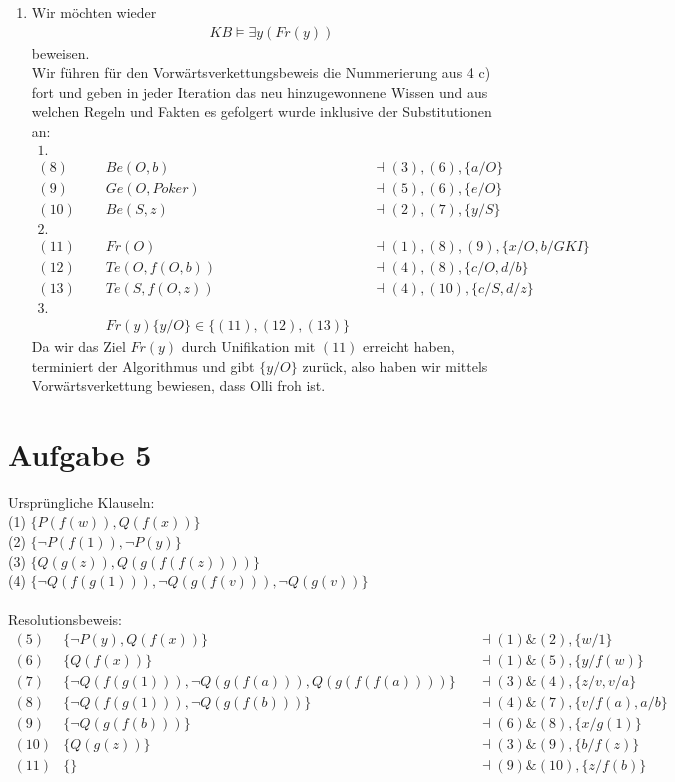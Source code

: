 \documentclass[a4paper,10pt]{article}
\begin{document}
\begin{enumerate}[~~a)]
    \item
    Wir möchten wieder
    \begin{align*}
KB \vDash \exists y (Fr(y))
\end{align*}
	beweisen.\\
    Wir führen für den Vorwärtsverkettungsbeweis die Nummerierung aus 4 c) fort und geben in jeder Iteration das neu hinzugewonnene Wissen und aus welchen Regeln und Fakten es gefolgert wurde inklusive der Substitutionen an:\\
    \begin{align*}
    \text{1. Iteration:}&\\
    (8) &Be(O,b) &&\dashv (3),(6),\{a/O\}\\
    (9) &Ge(O,Poker) &&\dashv (5),(6),\{e/O\}\\
    (10) &Be(S,z) &&\dashv (2),(7),\{y/S\}\\
    \text{2. Iteration:}&\\
    (11) &Fr(O) &&\dashv (1),(8),(9),\{x/O,b/GKI\}\\
    (12) &Te(O,f(O,b)) &&\dashv (4),(8),\{c/O,d/b\}\\
    (13) &Te(S,f(O,z)) &&\dashv (4),(10),\{c/S,d/z\}\\
    \text{3. Iteration:}&\\
    &Fr(y) \{y/O\} \in \{(11),(12),(13)\}
    \end{align*}
    Da wir das Ziel $Fr(y)$ durch Unifikation mit $(11)$ erreicht haben, terminiert der Algorithmus und gibt $\{y/O\}$ zurück, also haben wir mittels Vorwärtsverkettung bewiesen, dass Olli froh ist.
\end{enumerate}

\section*{Aufgabe 5}
Ursprüngliche Klauseln:\\
(1) $\{P(f(w)), Q(f(x))\}$\\
(2) $\{ \lnot P(f(1)), \lnot P(y) \}$\\
(3) $\{Q(g(z)), Q(g(f(f(z))))\}$\\
(4) $\{\lnot Q(f(g(1))), \lnot Q(g(f(v))), \lnot Q(g(v))\}$\\
\\
Resolutionsbeweis:\\
\begin{align*}
(5) &\{\lnot P(y), Q(f(x))\} &&\dashv (1) \& (2), \{w/1\}\\
(6) &\{Q(f(x))\} &&\dashv (1) \& (5), \{y/f(w)\}\\
(7) &\{\lnot Q(f(g(1))), \lnot Q(g(f(a))), Q(g(f(f(a))))\} &&\dashv (3) \& 		(4), \{z/v,v/a\}\\
(8) &\{\lnot Q(f(g(1))), \lnot Q(g(f(b)))\} &&\dashv (4) \& (7), \{v/f(a), 		a/b\}\\
(9) &\{\lnot Q(g(f(b)))\} &&\dashv (6) \& (8), \{x/g(1)\}\\
(10) &\{Q(g(z))\} &&\dashv (3) \& (9), \{b/f(z)\}\\
(11) &\{\} &&\dashv (9) \& (10), \{z/f(b)\}\\
\end{align*}
\end{document}

